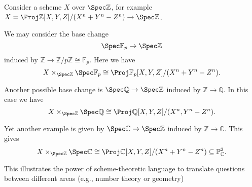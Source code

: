 Consider a scheme $X$ over $\Spec \mathbb{Z}$, for example
$X = \Proj \mathbb{Z}[X, Y, Z]/(X^n + Y^n - Z^n)\to \Spec \mathbb{Z}$.

We may consider the base change
\[ \Spec \mathbb{F}_p \to \Spec \mathbb{Z} \]
induced by $\mathbb{Z}\to \mathbb{Z}/p\mathbb{Z} \cong \mathbb{F}_p$. Here
we have
\[ X\times_{\Spec \mathbb{Z}} \Spec \mathbb{F}_p \cong \Proj \mathbb{F}_p[X, Y, Z]/(X^n + Y^n - Z^n). \]

Another possible base change is $\Spec \mathbb{Q}\to \Spec\mathbb{Z}$ induced by
$\mathbb{Z}\to \mathbb{Q}$. In this case we have
\[ X\times_{\Spec \mathbb{Z}}\Spec \mathbb{Q} \cong \Proj \mathbb{Q}[X, Y, Z]/(X^n, Y^n - Z^n). \]

Yet another example is given by $\Spec \mathbb{C}\to \Spec \mathbb{Z}$ induced by
$\mathbb{Z}\to \mathbb{C}$. This gives
\[ X\times_{\Spec \mathbb{Z}} \Spec \mathbb{C}\cong \Proj \mathbb{C}[X, Y, Z]/(X^n + Y^n - Z^n) \subseteq \mathbb{P}_{\mathbb{C}}^2. \]

This illustrates the power of scheme-theoretic language to translate questions
between different areas (e.g., number theory or geometry)
